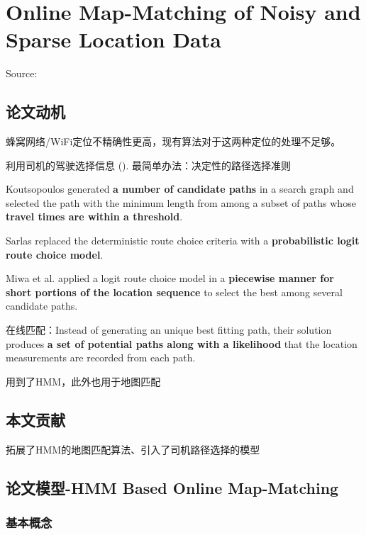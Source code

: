 \chapter{Online Map-Matching of Noisy and Sparse Location Data}

Source: \cite{Jagadeesh2017}

\section{论文动机}
    蜂窝网络/WiFi定位不精确性更高，现有算法对于这两种定位的处理不足够。
    
利用司机的驾驶选择信息 ().
最简单办法：决定性的路径选择准则

\begin{example}
    Koutsopoulos generated \textbf{a number of candidate paths} in a
search graph and selected the path with the minimum length
from among a subset of paths whose \textbf{travel times are within
a threshold}.

Sarlas replaced the deterministic route choice criteria with a
\textbf{probabilistic logit route choice model}.

Miwa et al. applied a logit route choice model in
a \textbf{piecewise manner for short portions of the location sequence}
to select the best among several candidate paths.
\end{example}

在线匹配：Instead of generating an unique best
fitting path, their solution produces \textbf{a set of potential paths
along with a likelihood} that the location measurements are
recorded from each path.

\cite{newson2009hidden} 用到了HMM，此外也用于地图匹配

\section{本文贡献}

拓展了HMM的地图匹配算法、引入了司机路径选择的模型

\section{论文模型-HMM Based Online Map-Matching}

\subsection{基本概念}

